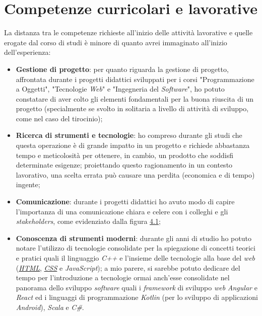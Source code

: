 \section{Competenze curricolari e lavorative}
La distanza tra le competenze richieste all'inizio delle attività lavorative e quelle erogate dal corso di studi è minore di quanto avrei immaginato all'inizio dell'esperienza: 
\begin{itemize}
    \item \textbf{Gestione di progetto}: per quanto riguarda la gestione di progetto, affrontata durante i progetti didattici sviluppati per i corsi "Programmazione a Oggetti", "Tecnologie \textit{Web}" e "Ingegneria del \textit{Software}", 
            ho potuto constatare di aver colto gli elementi fondamentali per la buona riuscita di un progetto (specialmente se svolto in solitaria a livello di attività di sviluppo, come nel caso del tirocinio);
    \item \textbf{Ricerca di strumenti e tecnologie}: ho compreso durante gli studi che questa operazione è di grande impatto in un progetto e richiede abbastanza tempo e meticolosità per ottenere, in cambio, un prodotto che soddisfi determinate esigenze; proiettando questo ragionamento in un
            contesto lavorativo, una scelta errata può causare una perdita (economica e di tempo) ingente;
    \item \textbf{Comunicazione}: durante i progetti didattici ho avuto modo di capire l'importanza di una comunicazione chiara e celere con i colleghi e gli \textit{stakeholders}, come evidenziato dalla figura \hyperref[fig:req]{4.1};
    \item \textbf{Conoscenza di strumenti moderni}: durante gli anni di studio ho potuto notare l'utilizzo di tecnologie consolidate per la spiegazione di concetti teorici e pratici quali il linguaggio \textit{C++} e l'insieme delle tecnologie alla base del \textit{web} (\hyperref[subsubsec:html]{\textit{HTML}}, \hyperref[subsubsec:css]{\textit{CSS}} e \textit{JavaScript});
            a mio parere, si sarebbe potuto dedicare del tempo per l'introduzione a tecnologie ormai anch'esse consolidate nel panorama dello sviluppo \textit{software} quali i \textit{framework} di sviluppo \textit{web} \textit{Angular} e \textit{React} ed i linguaggi di programmazione \textit{Kotlin} (per lo sviluppo di applicazioni \textit{Android}), \textit{Scala} e \textit{C\#}.
\end{itemize}